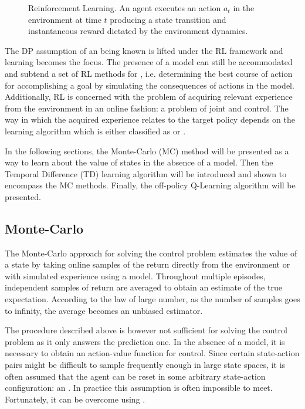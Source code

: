 \begin{figure}
  \centering
  
  \caption{Reinforcement Learning. An agent executes an action $a_t$ in the
  environment at time $t$ producing a state transition and instantaneous reward
  dictated by the environment dynamics.}
  \label{fig:rl}
\end{figure}

The DP assumption of an  being known is
lifted under the RL framework and  learning becomes the focus. The presence
of a model can still be accommodated and subtend a set of RL
methods for , i.e. determining the best course of action for
accomplishing a goal by simulating the consequences of actions in the model.
Additionally, RL is concerned with the problem of acquiring relevant experience
from the environment in an online fashion: a problem of joint
 and control. The way in which the acquired experience relates
to the target policy depends on the learning algorithm which is either
classified as  or .

 In the following sections, the Monte-Carlo (MC) method will be presented as a way to learn about the value of states in the absence of a model. Then the Temporal Difference (TD) learning algorithm will be introduced and shown to encompass the MC methods. Finally, the off-policy Q-Learning algorithm will be presented. 

\subsection{Monte-Carlo}
The Monte-Carlo approach for solving the control problem estimates the value
of a state by taking online samples of the return directly from the
environment or with simulated experience using a model. Throughout multiple episodes, independent samples of return are averaged to
obtain an estimate of the true expectation. According to the law of large number, as
the number of samples goes to infinity, the average becomes an unbiased
estimator. 

The procedure described above is however not sufficient for solving the control
problem as it only answers the prediction one. In the absence of a model, it is
necessary to obtain an action-value function for control. Since certain state-action pairs might be difficult to sample frequently enough in large state spaces, it
is often assumed that the agent can be reset in some arbitrary state-action
configuration: an . In practice this assumption is often impossible to meet.  Fortunately, it can be overcome using .

